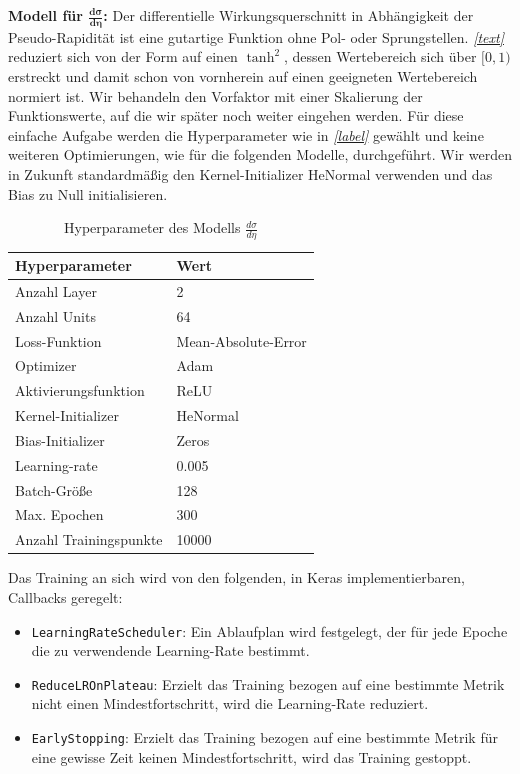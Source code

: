 \textbf{Modell für $\mathbf{\frac{d\sigma}{d\eta}}$:} 
Der differentielle Wirkungsquerschnitt in Abhängigkeit der Pseudo-Rapidität ist eine gutartige Funktion ohne Pol- oder Sprungstellen. \textit{\autoref{text}} reduziert sich von der Form auf einen $\tanh^2$, dessen Wertebereich sich über $[0,1)$ erstreckt und damit schon von vornherein auf einen geeigneten Wertebereich normiert ist. Wir behandeln den Vorfaktor mit einer Skalierung der Funktionswerte, auf die wir später noch weiter eingehen werden. 
Für diese einfache Aufgabe werden die Hyperparameter wie in \textit{\autoref{label}} gewählt und keine weiteren Optimierungen, wie für die folgenden Modelle, durchgeführt. Wir werden in Zukunft standardmäßig den Kernel-Initializer HeNormal verwenden und das Bias zu Null initialisieren.
\begin{table}[hbt]
	\centering
	\begin{tabular}{|l|l|}
		\hline
		Hyperparameter & Wert \\
		\hline
		Anzahl Layer & 2 \\
		Anzahl Units & 64 \\
		Loss-Funktion & Mean-Absolute-Error \\
		Optimizer & Adam \\
		Aktivierungsfunktion & ReLU \\
		Kernel-Initializer & HeNormal \\
		Bias-Initializer & Zeros \\
		Learning-rate & 0.005 \\
		Batch-Größe & 128 \\
		Max. Epochen & 300 \\
		Anzahl Trainingspunkte & 10000\\
		\hline
	\end{tabular}
	\caption{Hyperparameter des Modells $\frac{d\sigma}{d\eta}$}
\end{table}
Das Training an sich wird von den folgenden, in Keras implementierbaren, Callbacks geregelt:
\begin{itemize}
	\item \texttt{LearningRateScheduler}: Ein Ablaufplan wird festgelegt, der für jede Epoche die zu verwendende Learning-Rate bestimmt. 
	\item \texttt{ReduceLROnPlateau}: Erzielt das Training bezogen auf eine bestimmte Metrik nicht einen Mindestfortschritt, wird die Learning-Rate reduziert.
	\item \texttt{EarlyStopping}: Erzielt das Training bezogen auf eine bestimmte Metrik für eine gewisse Zeit keinen Mindestfortschritt, wird das Training gestoppt.
\end{itemize}
